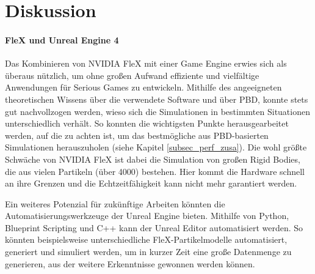 \chapter{Diskussion}


\subsubsection{FleX und Unreal Engine 4}
Das Kombinieren von NVIDIA FleX mit einer Game Engine erwies sich als überaus nützlich, um ohne großen Aufwand effiziente und vielfältige Anwendungen für Serious Games zu entwickeln. 
Mithilfe des angeeigneten theoretischen Wissens über die verwendete Software und über PBD, konnte stets gut nachvollzogen werden, wieso sich die Simulationen in bestimmten Situationen unterschiedlich verhält. 
So konnten die wichtigsten Punkte herausgearbeitet werden, auf die zu achten ist, um das bestmögliche aus PBD-basierten Simulationen herauszuholen (siehe Kapitel \ref{subsec_perf_zusa}). Die wohl größte Schwäche von NVIDIA FleX ist dabei die Simulation von großen Rigid Bodies, die aus vielen Partikeln (über 4000) bestehen. Hier kommt die Hardware schnell an ihre Grenzen und die Echtzeitfähigkeit kann nicht mehr garantiert werden.


Ein weiteres Potenzial für zukünftige Arbeiten könnten die Automatisierungswerkzeuge der Unreal Engine bieten. Mithilfe von Python, Blueprint Scripting und C++ kann der Unreal Editor automatisiert werden. So könnten beispielsweise unterschiedliche FleX-Partikelmodelle automatisiert, generiert und simuliert werden, um in kurzer Zeit eine große Datenmenge zu generieren, aus der weitere Erkenntnisse gewonnen werden können.

